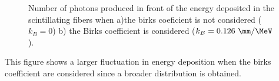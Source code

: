 \begin{figure}[h]
 \centering
 \caption{Number of photons produced in front of the energy deposited in the scintillating fibers when a)the birks coeficient is not considered ($k_B=0$) b) the Birks coefficient is considered ($k_B=0.126~\mm/\MeV$).}
 \label{fig:2DimPlotBirks}
\end{figure}

This figure shows a larger fluctuation in energy deposition when the birks coefficient are considered since a broader distribution is obtained.